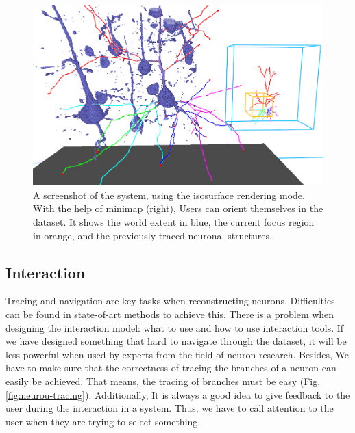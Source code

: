 \documentclass[10pt,twocolumn,letterpaper]{article}
\begin{document}
\begin{figure}[h]
\begin{center}
   \includegraphics[width=1.0\linewidth]{neuron-render.png}
\end{center}
   \caption{A screenshot of the system, using the isosurface rendering mode. With the help of minimap (right), Users can orient themselves in the dataset. It shows the world extent in blue, the current
focus region in orange, and the previously traced neuronal structures.}
\label{fig:neuron-render}
\end{figure}

\subsection{Interaction}
Tracing and navigation are key tasks when reconstructing neurons. Difficulties can be found in state-of-art methods to achieve this. There is a problem when designing the interaction model: what to use and how to use interaction tools. If we have designed something that hard to navigate through the dataset, it will be less powerful when used by experts from the field of neuron research. Besides, We have to make sure that the correctness of tracing the branches of a neuron can easily be achieved. That means, the tracing of branches must be easy (Fig. \ref{fig:neurou-tracing}). Additionally, It is always a good idea to give feedback to the user during the interaction in a system. Thus, we have to call attention to the user when they are trying to select something.
\end{document}
